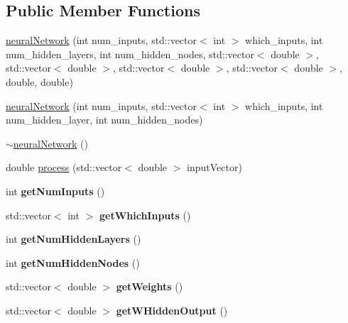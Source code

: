 \subsection*{Public Member Functions}
\begin{DoxyCompactItemize}
\item 
\hyperlink{classneural_network_aee6fd482cd0b6b4004759bb57d4b14db}{neural\+Network} (int num\+\_\+inputs, std\+::vector$<$ int $>$ which\+\_\+inputs, int num\+\_\+hidden\+\_\+layers, int num\+\_\+hidden\+\_\+nodes, std\+::vector$<$ double $>$, std\+::vector$<$ double $>$, std\+::vector$<$ double $>$, std\+::vector$<$ double $>$, double, double)
\item 
\hyperlink{classneural_network_ad5cad1e6ac86745ab47fceeb8d42cbd9}{neural\+Network} (int num\+\_\+inputs, std\+::vector$<$ int $>$ which\+\_\+inputs, int num\+\_\+hidden\+\_\+layer, int num\+\_\+hidden\+\_\+nodes)
\item 
\hyperlink{classneural_network_a0967982cb0345a610f78d225d812086f}{$\sim$neural\+Network} ()
\item 
double \hyperlink{classneural_network_a2da76293dbe590594e79e96768c02a29}{process} (std\+::vector$<$ double $>$ input\+Vector)
\item 
\mbox{\label{classneural_network_aaf9ff8b1a88126fcffc1e9f07a4ffe49}} 
int {\bfseries get\+Num\+Inputs} ()
\item 
\mbox{\label{classneural_network_afc93cb28c3897d4d1faa4ac8fbf0c1f8}} 
std\+::vector$<$ int $>$ {\bfseries get\+Which\+Inputs} ()
\item 
\mbox{\label{classneural_network_ade72f91a9207f52618f9b70cb585a992}} 
int {\bfseries get\+Num\+Hidden\+Layers} ()
\item 
\mbox{\label{classneural_network_a679a628a34f70dd52f781c8c9dbd1a02}} 
int {\bfseries get\+Num\+Hidden\+Nodes} ()
\item 
\mbox{\label{classneural_network_a9822cd69469d7b2a946a9f87c8bebe5f}} 
std\+::vector$<$ double $>$ {\bfseries get\+Weights} ()
\item 
\mbox{\label{classneural_network_ac372190f6eabf0af27e5c317f2a1d51b}} 
std\+::vector$<$ double $>$ {\bfseries get\+W\+Hidden\+Output} ()

\end{DoxyCompactItemize}
